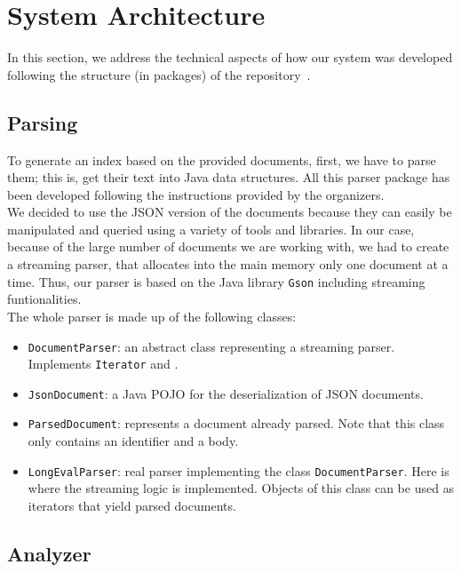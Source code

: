 \section{System Architecture}\label{sec:architecture}

In this section, we address the technical aspects of how our system was developed following the structure (in packages)
of the repository~\cite{jihuming}.

\subsection{Parsing}\label{subsec:parsing}

To generate an index based on the provided documents, first, we have to parse them;
this is, get their text into Java data structures.
All this parser package has been developed following the instructions provided by the organizers.\\

We decided to use the JSON version of the documents because they can easily be manipulated and queried using a
variety of tools and libraries.
In our case, because of the large number of documents we are working with, we had to create a streaming parser,
that allocates into the main memory only one document at a time.
Thus, our parser is based on the Java library \texttt{Gson} including streaming funtionalities.\\

The whole parser is made up of the following classes:
\begin{itemize}
    \item \texttt{DocumentParser}: an abstract class representing a streaming parser.
          Implements \texttt{Iterator} and .
    \item \texttt{JsonDocument}: a Java POJO for the deserialization of JSON documents.
    \item \texttt{ParsedDocument}: represents a document already parsed.
          Note that this class only contains an identifier and a body.
    \item \texttt{LongEvalParser}: real parser implementing the class \texttt{DocumentParser}.
          Here is where the streaming logic is implemented.
          Objects of this class can be used as iterators that yield parsed documents.
\end{itemize}

\subsection{Analyzer}\label{subsec:analyzer}

